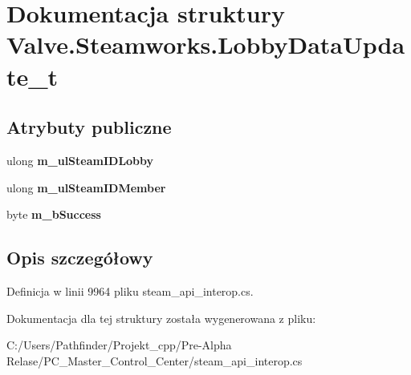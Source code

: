 \hypertarget{struct_valve_1_1_steamworks_1_1_lobby_data_update__t}{}\section{Dokumentacja struktury Valve.\+Steamworks.\+Lobby\+Data\+Update\+\_\+t}
\label{struct_valve_1_1_steamworks_1_1_lobby_data_update__t}
\subsection*{Atrybuty publiczne}
\begin{DoxyCompactItemize}
\item 
\mbox{\label{struct_valve_1_1_steamworks_1_1_lobby_data_update__t_a9e0a9e2b40bdec6a3e1ca88b1e312023}} 
ulong {\bfseries m\+\_\+ul\+Steam\+I\+D\+Lobby}
\item 
\mbox{\label{struct_valve_1_1_steamworks_1_1_lobby_data_update__t_ae9169f89a5cf77aef54561e5478d67f8}} 
ulong {\bfseries m\+\_\+ul\+Steam\+I\+D\+Member}
\item 
\mbox{\label{struct_valve_1_1_steamworks_1_1_lobby_data_update__t_abef91474d402de3db8ac8b10527c9c57}} 
byte {\bfseries m\+\_\+b\+Success}
\end{DoxyCompactItemize}


\subsection{Opis szczegółowy}


Definicja w linii 9964 pliku steam\+\_\+api\+\_\+interop.\+cs.



Dokumentacja dla tej struktury została wygenerowana z pliku\+:\begin{DoxyCompactItemize}
\item 
C\+:/\+Users/\+Pathfinder/\+Projekt\+\_\+cpp/\+Pre-\/\+Alpha Relase/\+P\+C\+\_\+\+Master\+\_\+\+Control\+\_\+\+Center/steam\+\_\+api\+\_\+interop.\+cs\end{DoxyCompactItemize}
